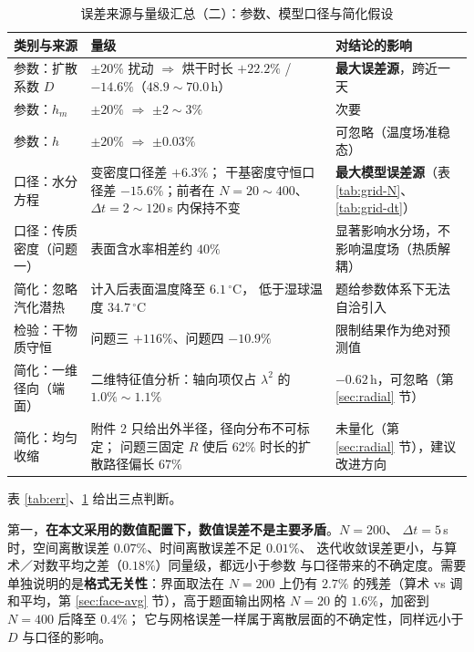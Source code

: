 \documentclass[12pt,a4paper,fontset=none]{ctexart}
\begin{document}
\begin{table}[htbp]
  \centering
  \caption{误差来源与量级汇总（二）：参数、模型口径与简化假设}
  \label{tab:err2}
  \small
  \begin{tabular}{p{2.6cm}p{5.2cm}p{6.2cm}}
    \toprule
    类别与来源 & 量级 & 对结论的影响 \\
    \midrule
    参数：扩散系数 $D$ & $\pm20\%$ 扰动 $\Rightarrow$ 烘干时长
      $+22.2\%$ / $-14.6\%$（$48.9\sim70.0$\,h）
      & \textbf{最大误差源}，跨近一天 \\
    参数：$h_m$ & $\pm20\%$ $\Rightarrow$ $\pm2\sim3\%$
      & 次要 \\
    参数：$h$ & $\pm20\%$ $\Rightarrow$ $\pm0.03\%$
      & 可忽略（温度场准稳态） \\
    \midrule
    口径：水分方程 & 变密度口径差 $+6.3\%$；
      干基密度守恒口径差 $-15.6\%$；前者在
      $N=20\sim400$、$\Delta t=2\sim120$\,s 内保持不变
      & \textbf{最大模型误差源}（表 \ref{tab:grid-N}、\ref{tab:grid-dt}） \\
    口径：传质密度（问题一） & 表面含水率相差约 $40\%$
      & 显著影响水分场，不影响温度场（热质解耦） \\
    简化：忽略汽化潜热 & 计入后表面温度降至 $6.1\,^\circ$C，
      低于湿球温度 $34.7\,^\circ$C
      & 题给参数体系下无法自洽引入 \\
    检验：干物质守恒 & 问题三 $+116\%$、问题四 $-10.9\%$
      & 限制结果作为绝对预测值 \\
    简化：一维径向（端面） & 二维特征值分析：轴向项仅占 $\lambda^2$ 的
      $1.0\%\sim1.1\%$
      & $-0.62$\,h，可忽略（第 \ref{sec:radial} 节） \\
    简化：均匀收缩 & 附件 2 只给出外半径，径向分布不可标定；
      问题三固定 $R$ 使后 $62\%$ 时长的扩散路径偏长 $67\%$
      & 未量化（第 \ref{sec:radial} 节），建议改进方向 \\
    \bottomrule
  \end{tabular}
\end{table}

表 \ref{tab:err}、\ref{tab:err2} 给出三点判断。

第一，\textbf{在本文采用的数值配置下，数值误差不是主要矛盾}。$N=200$、
$\Delta t=5$\,s 时，空间离散误差 $0.07\%$、时间离散误差不足 $0.01\%$、
迭代收敛误差更小，与算术／对数平均之差（$0.18\%$）同量级，都远小于参数
与口径带来的不确定度。需要单独说明的是\textbf{格式无关性}：界面取法在
$N=200$ 上仍有 $2.7\%$ 的残差（算术 vs 调和平均，第 \ref{sec:face-avg}
节），高于题面输出网格 $N=20$ 的 $1.6\%$，加密到 $N=400$ 后降至 $0.4\%$；
它与网格误差一样属于离散层面的不确定性，同样远小于 $D$ 与口径的影响。
\end{document}
